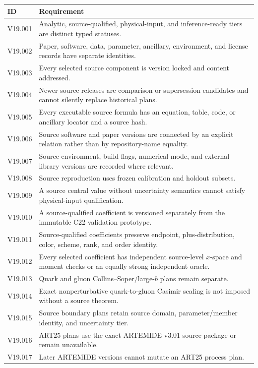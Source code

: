 \documentclass[11pt]{article}
\begin{document}
\begin{longtable}{L{0.12\textwidth}L{0.80\textwidth}}
\toprule
ID & Requirement\\
\midrule
\endhead
V19.001 & Analytic, source-qualified, physical-input, and inference-ready tiers are distinct typed statuses.\\
V19.002 & Paper, software, data, parameter, ancillary, environment, and license records have separate identities.\\
V19.003 & Every selected source component is version locked and content addressed.\\
V19.004 & Newer source releases are comparison or supersession candidates and cannot silently replace historical plans.\\
V19.005 & Every executable source formula has an equation, table, code, or ancillary locator and a source hash.\\
V19.006 & Source software and paper versions are connected by an explicit relation rather than by repository-name equality.\\
V19.007 & Source environment, build flags, numerical mode, and external library versions are recorded where relevant.\\
V19.008 & Source reproduction uses frozen calibration and holdout subsets.\\
V19.009 & A source central value without uncertainty semantics cannot satisfy physical-input qualification.\\
V19.010 & A source-qualified coefficient is versioned separately from the immutable C22 validation prototype.\\
V19.011 & Source-qualified coefficients preserve endpoint, plus-distribution, color, scheme, rank, and order identity.\\
V19.012 & Every selected coefficient has independent source-level \(x\)-space and moment checks or an equally strong independent oracle.\\
V19.013 & Quark and gluon Collins--Soper/large-\(b\) plans remain separate.\\
V19.014 & Exact nonperturbative quark-to-gluon Casimir scaling is not imposed without a source theorem.\\
V19.015 & Source boundary plans retain source domain, parameter/member identity, and uncertainty tier.\\
V19.016 & ART25 plans use the exact ARTEMIDE v3.01 source package or remain unavailable.\\
V19.017 & Later ARTEMIDE versions cannot mutate an ART25 process plan.\\

\end{longtable}
\end{document}
